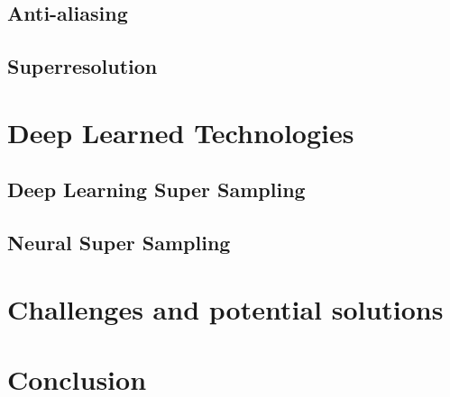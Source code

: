 \documentclass[10pt,oneside,english,a4paper]{article}
\begin{document}
\subsection{Anti-aliasing} \label{aasr:aa}

\subsection{Superresolution} \label{aasr:sr}

\section{Deep Learned Technologies} \label{deep}

\subsection{Deep Learning Super Sampling} \label{deep:dlss}

\subsection{Neural Super Sampling} \label{deep:neural}

\section{Challenges and potential solutions} \label{challenges}




\section{Conclusion} \label{conclusion}







\end{document}
